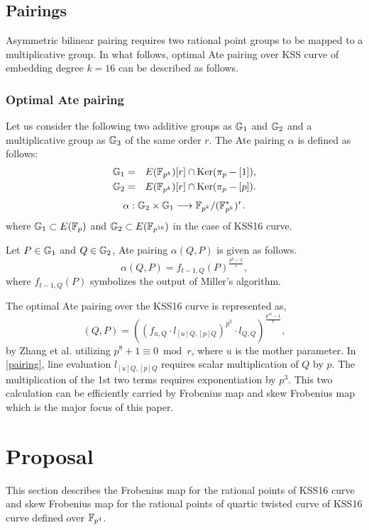 \subsection{Pairings}
 Asymmetric bilinear pairing requires two rational point groups to be mapped to a multiplicative group.
In what follows,  optimal Ate pairing over KSS curve of embedding degree $k = 16$ can be described as follows.
\subsubsection{Optimal Ate pairing}
Let us consider the following two additive groups as ${\mathbb{G}}_{1}$ and ${\mathbb{G}}_{2}$ and a multiplicative group as ${\mathbb{G}}_{3}$ of the same order $r$. The Ate pairing $\alpha$ is defined as follows:
\begin{eqnarray}
	{\mathbb{G}}_{1}&=&E(\mathbb{F}_{p^k})[r]\cap {\rm Ker}(\pi_p-[1])\nonumber,\\
	{\mathbb{G}}_{2}&=&E(\mathbb{F}_{p^k})[r]\cap {\rm Ker}(\pi_p-[p])\nonumber.
\end{eqnarray}
\begin{eqnarray}
	\alpha:{\mathbb{G}}_{2}\times{\mathbb{G}}_{1}\longrightarrow\mathbb{F}_{p^k}/(\mathbb{F}_{p^k}^*)^r.
\end{eqnarray}
where ${\mathbb{G}}_{1} \subset E(\mathbb{F}_p)$ and ${\mathbb{G}}_{2} \subset E(\mathbb{F}_{p^{16}})$  in the case of KSS16 curve.

Let $P \in {\mathbb{G}}_{1}$ and $Q\in{\mathbb{G}}_{2}$, Ate pairing $\alpha(Q,P)$ is given as follows.
\begin{equation}
	\alpha(Q,P)=f_{t-1,Q}(P)^{\frac{p^k-1}{r}},
\end{equation}
where $f_{t-1,Q}(P)$ symbolizes the output of Miller's algorithm. 

The optimal Ate pairing over the KSS16 curve is represented as,
\begin{equation}
	(Q,P)=((f_{u,Q}\cdot l_{[u]Q,[p]Q})^{p^3}\cdot l_{Q,Q})^{\frac{p^{16}-1}{r}}\label{pairing},
\end{equation}
by  Zhang et al. \cite{INDOCRYPT:ZhaLin12} utilizing $p^8 +1 \equiv 0 \bmod r$, where $u$ is the mother parameter.
In \eqref{pairing}, line evaluation $l_{[u]Q,[p]Q}$ requires scalar multiplication of $Q$ by $p$. The multiplication of the 1st two terms requires exponentiation by $p^3$. This two calculation can be efficiently carried by Frobenius map and skew Frobenius map which is the major focus of this paper.

\section{Proposal}
This section describes the Frobenius map for the rational points of KSS16 curve and skew Frobenius map for the rational points of quartic twisted curve of KSS16 curve defined over $\mathbb{F}_{p^4}$.


